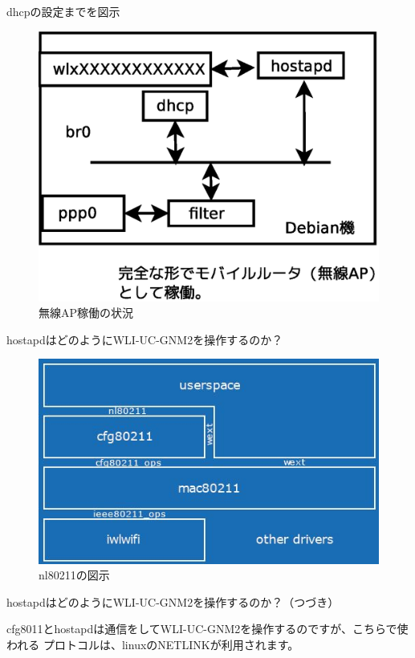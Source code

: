 \begin{frame}{dhcpの設定までを図示}

\begin{figure}[htbp]
\includegraphics[width=0.8\hsize]{image201512/dhcp.eps}
\caption{無線AP稼働の状況}
\end{figure}

\end{frame}

\begin{frame}{hostapdはどのようにWLI-UC-GNM2を操作するのか？}

\begin{figure}[htbp]
\includegraphics[width=0.8\hsize]{image201512/mac80211_arch.jpg}
\caption{nl80211の図示}
\end{figure}

\end{frame}


\begin{frame}{hostapdはどのようにWLI-UC-GNM2を操作するのか？（つづき）}

  cfg8011とhostapdは通信をしてWLI-UC-GNM2を操作するのですが、こちらで使われる
 プロトコルは、linuxのNETLINKが利用されます。

\end{frame}

